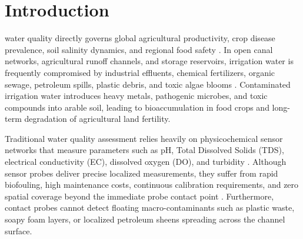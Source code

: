 \documentclass[journal]{IEEEtran}
\begin{document}
\section{Introduction}
\label{sec:introduction}

 water quality directly governs global agricultural productivity, crop disease prevalence, soil salinity dynamics, and regional food safety \cite{agri_water_opt_2024, state_of_art_irrigation_2023}. In open canal networks, agricultural runoff channels, and storage reservoirs, irrigation water is frequently compromised by industrial effluents, chemical fertilizers, organic sewage, petroleum spills, plastic debris, and toxic algae blooms \cite{iot_ml_water_review_2023, online_water_monitoring_2023}. Contaminated irrigation water introduces heavy metals, pathogenic microbes, and toxic compounds into arable soil, leading to bioaccumulation in food crops and long-term degradation of agricultural land fertility.

Traditional water quality assessment relies heavily on physicochemical sensor networks that measure parameters such as pH, Total Dissolved Solids (TDS), electrical conductivity (EC), dissolved oxygen (DO), and turbidity \cite{advancements_water_quality_2024, wqi_semiarid_2024}. Although sensor probes deliver precise localized measurements, they suffer from rapid biofouling, high maintenance costs, continuous calibration requirements, and zero spatial coverage beyond the immediate probe contact point \cite{cnt_sensor_water_2023, wqi_regression_2024}. Furthermore, contact probes cannot detect floating macro-contaminants such as plastic waste, soapy foam layers, or localized petroleum sheens spreading across the channel surface.
\end{document}
